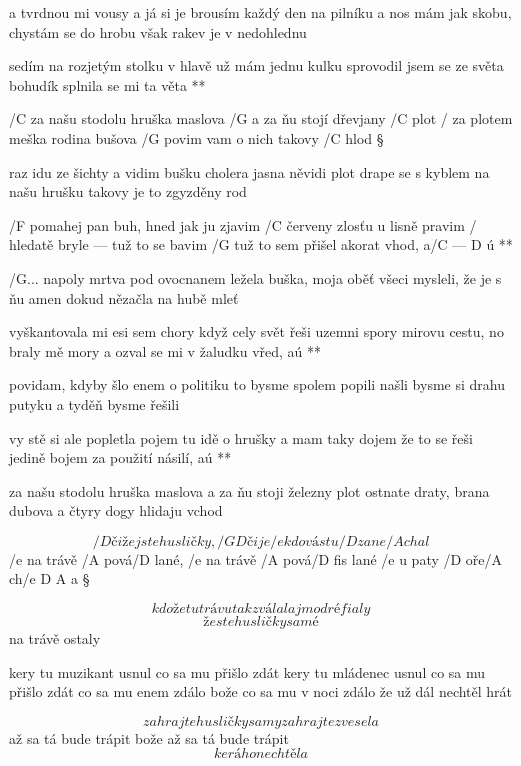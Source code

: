 a tvrdnou mi vousy a já si je brousím
každý den na pilníku
a nos mám jak skobu, chystám se do hrobu
však rakev je v nedohlednu \s

\R sedím na rozjetým stolku
   v hlavě už mám jednu kulku
   sprovodil jsem se ze světa
   bohudík splnila se mi ta věta **




/C za našu stodolu hruška maslova
/G a za ňu stojí dřevjany /C plot
/ za plotem meška rodina bušova
/G povim vam o nich takovy /C hlod \S

raz idu ze šichty a vidim bušku
cholera jasna něvidi plot
drape se s kyblem na našu hrušku
takovy je to zgyzděny rod \s

\R /F pomahej pan buh, hned jak ju zjavim
   /C červeny zlosťu u lisně pravim
   / hledatě bryle --- tuž to se bavim
   /G tuž to sem přišel akorat vhod, a/{C --- D} ú **

/{G...} napoly mrtva pod ovocnanem
ležela buška, moja oběť
všeci mysleli, že je s ňu amen
dokud nězačla na hubě mleť \s

\R vyškantovala mi esi sem chory
   když cely svět řeši uzemni spory
   mirovu cestu, no braly mě mory
   a ozval se mi v žaludku vřed, aú   **

povidam, kdyby šlo enem o politiku
to bysme spolem popili
našli bysme si drahu putyku
a tyděň bysme řešili \s

\R vy stě si ale popletla pojem
   tu idě o hrušky a mam taky dojem
   že to se řeši jedině bojem
   za použití násilí, aú **

za našu stodolu hruška maslova
a za ňu stoji železny plot
ostnate draty, brana dubova
a čtyry dogy hlidaju vchod





\[ /D čiže jste husličky, /{G D} čije
/e kdo vás tu /D zane/A chal \]
/e na trávě /A pová/D lané, /e na trávě /A pová/{D fis} lané
/e u paty /D oře/A ch/{e D A} a \S

\[ kdože tu trávu tak zválal
aj modré fialy \]
\[ že ste husličky samé \]
na trávě ostaly \s

kery tu muzikant usnul
co sa mu přišlo zdát
kery tu mládenec usnul
co sa mu přišlo zdát
co sa mu enem zdálo
bože co sa mu v noci zdálo
že už dál nechtěl hrát \s

\[ zahrajte husličky samy
zahrajte zvesela \]
až sa tá bude trápit
bože až sa tá bude trápit
\[ kerá ho nechtěla \]



